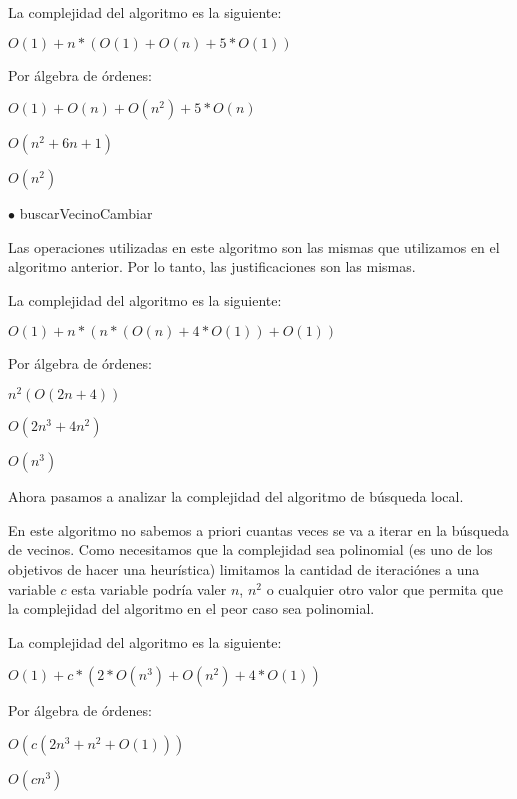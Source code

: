 La complejidad del algoritmo es la siguiente:

$O(1)+n*(O(1)+O(n)+5*O(1))$

Por álgebra de órdenes:

$O(1)+O(n)+O(n^2)+5*O(n)$

$O(n^2+6n+1)$

$O(n^2)$

$\bullet$ buscarVecinoCambiar

Las operaciones utilizadas en este algoritmo son las mismas que utilizamos en el algoritmo anterior. Por lo tanto, las justificaciones son las mismas.

La complejidad del algoritmo es la siguiente:

$O(1) + n*(n*(O(n) +4*O(1))+O(1))$

Por álgebra de órdenes:

$n^2(O(2n+4))$

$O(2n^3+4n^2)$

$O(n^3)$

Ahora pasamos a analizar la complejidad del algoritmo de búsqueda local.

En este algoritmo no sabemos a priori cuantas veces se va a iterar en la búsqueda de vecinos. Como necesitamos que la complejidad sea polinomial (es uno de los objetivos de hacer una heurística) limitamos la cantidad de iteraciónes a una variable $c$ esta variable podría valer $n$, $n^2$ o cualquier otro valor que permita que la complejidad del algoritmo en el peor caso sea polinomial.

La complejidad del algoritmo es la siguiente:

$O(1)+c*(2*O(n^3)+O(n^2)+4*O(1))$

Por álgebra de órdenes:

$O(c(2n^3+n^2+O(1)))$

$O(cn^3)$